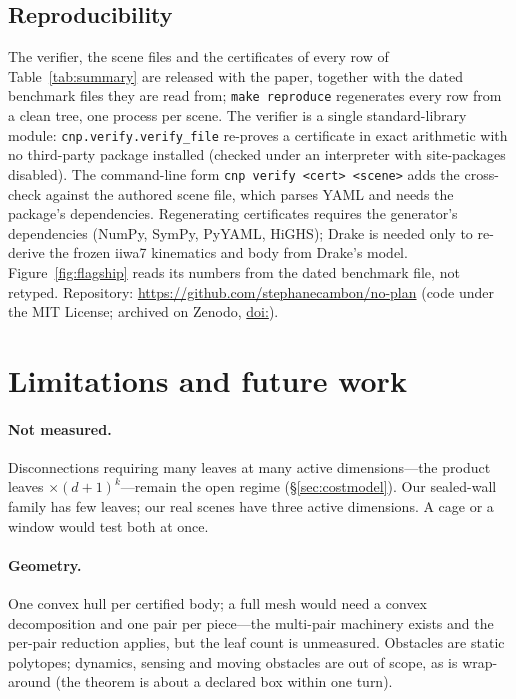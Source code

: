 \documentclass[10pt,twocolumn,letterpaper]{article}
\newcommand{\ZENODODOI}[1]{\if\relax\detokenize{#1}\relax\else; archived on Zenodo, \href{https://doi.org/#1}{doi:#1}\fi}
\begin{document}
\subsection{Reproducibility}
The verifier, the scene files and the certificates of every row of Table~\ref{tab:summary} are released with the paper, together with the dated benchmark files they are read from; \texttt{make reproduce} regenerates every row from a clean tree, one process per scene. The verifier is a single standard-library module: \texttt{cnp.verify.verify\_file} re-proves a certificate in exact arithmetic with no third-party package installed (checked under an interpreter with site-packages disabled). The command-line form \texttt{cnp verify <cert> <scene>} adds the cross-check against the authored scene file, which parses YAML and needs the package's dependencies. Regenerating certificates requires the generator's dependencies (NumPy, SymPy, PyYAML, HiGHS); Drake is needed only to re-derive the frozen iiwa7 kinematics and body from Drake's model. Figure~\ref{fig:flagship} reads its numbers from the dated benchmark file, not retyped. Repository: \url{https://github.com/stephanecambon/no-plan} (code under the MIT License\ZENODODOI{}).

\section{Limitations and future work}\label{sec:limitations}

\paragraph{Not measured.} Disconnections requiring many leaves at many active dimensions---the product leaves $\times(d+1)^k$---remain the open regime (\S\ref{sec:costmodel}). Our sealed-wall family has few leaves; our real scenes have three active dimensions. A cage or a window would test both at once.

\paragraph{Geometry.} One convex hull per certified body; a full mesh would need a convex decomposition and one pair per piece---the multi-pair machinery exists and the per-pair reduction applies, but the leaf count is unmeasured. Obstacles are static polytopes; dynamics, sensing and moving obstacles are out of scope, as is wrap-around (the theorem is about a declared box within one turn).
\end{document}
